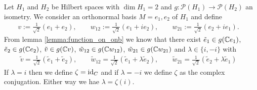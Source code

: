 \begin{example} \label{example:twodim}
	Let $H_1$ and $H_2$ be Hilbert spaces with $\dim H_1 = 2$ and $g: \mathcal{P}(H_1) \to \mathcal{P}(H_2)$ an isometry. We consider an orthonormal basis $M = {e_1, e_2}$ of $H_1$ and define
	\begin{align*}
		v := \frac{1}{\sqrt{2}}(e_1 + e_2), \qquad w_{12} := \frac{1}{\sqrt{2}}(e_1 + i e_2), \qquad  w_{21} := \frac{1}{\sqrt{2}}(e_2 + i e_1).
	\end{align*} 
	From lemma \ref{lemma:function_on_onb} we know that there exist $\tilde{e}_1 \in g(\mathbb{C} e_1)$, $\tilde{e}_2 \in g(\mathbb{C} e_2)$, $\tilde{v} \in g(\mathbb{C} v)$, $\tilde{w}_{12} \in g(\mathbb{C} w_{12})$, $\tilde{w}_{21} \in g(\mathbb{C} w_{21})$ and $\lambda \in \{i, -i\}$ with
	\begin{align*}
		\tilde{v} = \frac{1}{\sqrt{2}}(\tilde{e}_1 + \tilde{e}_2), \qquad \tilde{w}_{12} = \frac{1}{\sqrt{2}}(\tilde{e}_1 + \lambda \tilde{e}_2), \qquad \tilde{w}_{21} = \frac{1}{\sqrt{2}}(\tilde{e}_2 + \lambda \tilde{e}_1)
	\end{align*} 
	If $\lambda = i$ then we define $\zeta = \operatorname{id}_C$ and if $\lambda = -i$ we define $\zeta$ as the complex conjugation. Either way we hae $\lambda = \zeta(i)$.
	

\end{example}
